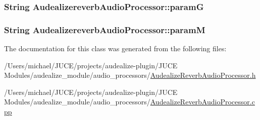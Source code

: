 \subsubsection[{\texorpdfstring{paramG}{paramG}}]{\setlength{\rightskip}{0pt plus 5cm}String Audealizereverb\+Audio\+Processor\+::paramG\hspace{0.3cm}{\ttfamily [static]}}\hypertarget{class_audealizereverb_audio_processor_a2a3fc9c4b12a08e68aa8457cae9ce3ff}{}\label{class_audealizereverb_audio_processor_a2a3fc9c4b12a08e68aa8457cae9ce3ff}
\subsubsection[{\texorpdfstring{paramM}{paramM}}]{\setlength{\rightskip}{0pt plus 5cm}String Audealizereverb\+Audio\+Processor\+::paramM\hspace{0.3cm}{\ttfamily [static]}}\hypertarget{class_audealizereverb_audio_processor_a3e3ec2690abdac5cbca63fccd0f0d362}{}\label{class_audealizereverb_audio_processor_a3e3ec2690abdac5cbca63fccd0f0d362}


The documentation for this class was generated from the following files\+:\begin{DoxyCompactItemize}
\item 
/\+Users/michael/\+J\+U\+C\+E/projects/audealize-\/plugin/\+J\+U\+C\+E Modules/audealize\+\_\+module/audio\+\_\+processors/\hyperlink{_audealize_reverb_audio_processor_8h}{Audealize\+Reverb\+Audio\+Processor.\+h}\item 
/\+Users/michael/\+J\+U\+C\+E/projects/audealize-\/plugin/\+J\+U\+C\+E Modules/audealize\+\_\+module/audio\+\_\+processors/\hyperlink{_audealize_reverb_audio_processor_8cpp}{Audealize\+Reverb\+Audio\+Processor.\+cpp}\end{DoxyCompactItemize}
